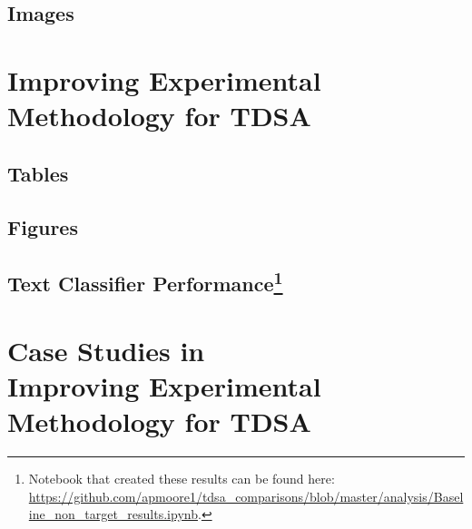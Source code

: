 \documentclass[11pt]{report}
\begin{document}
\section{Images}
\label{appendix_reproducibility_images}

\chapter[Improving Experimental Methodology for TDSA]{Improving Experimental\\Methodology for TDSA}
\section{Tables}
\label{appendix_augmentation_tables}

\section{Figures}
\label{appendix_augmentation_figures}

\section[Text Classifier Performance]{Text Classifier Performance\footnote{Notebook that created these results can be found here: \url{https://github.com/apmoore1/tdsa_comparisons/blob/master/analysis/Baseline_non_target_results.ipynb}.}}
\label{section:appendix_cnn_tdsa_baseline}

\chapter[Case Studies in Improving Experimental Methodology for TDSA]{Case Studies in\\Improving Experimental\\Methodology for TDSA}
%
\end{document}
